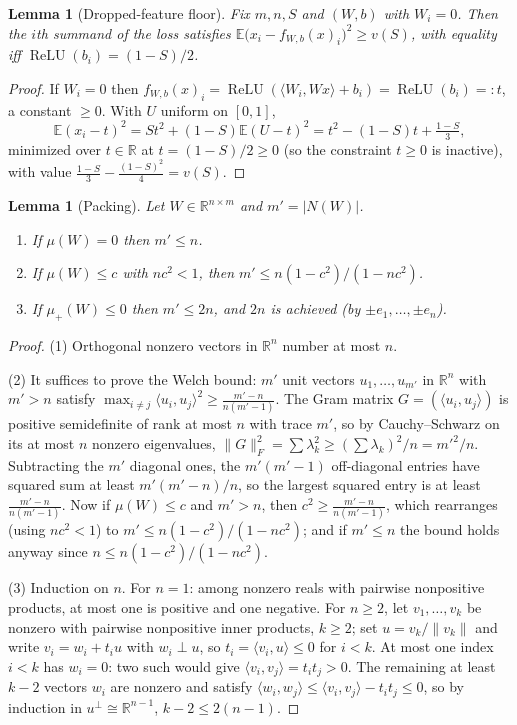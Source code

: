 \documentclass[11pt]{amsart}
\theoremstyle{plain}
\newtheorem{lemma}[theorem]{Lemma}
\theoremstyle{definition}
\DeclareMathOperator{\relu}{ReLU}
\newcommand{\E}{\mathbb{E}}
\newcommand{\R}{\mathbb{R}}
\begin{document}
\begin{lemma}[Dropped-feature floor]\label{lem:floor}
Fix $m,n,S$ and $(W,b)$ with $W_i=0$. Then the $i$th summand of the loss satisfies
$\E\bigl(x_i - f_{W,b}(x)_i\bigr)^2 \ge v(S)$, with equality iff $\relu(b_i)=(1-S)/2$.
\end{lemma}

\begin{proof}
If $W_i=0$ then $f_{W,b}(x)_i=\relu(\langle W_i, Wx\rangle + b_i)=\relu(b_i)=:t$, a constant $\ge0$. With $U$ uniform on $[0,1]$,
\[
\E(x_i-t)^2 = S t^2 + (1-S)\E(U-t)^2 = t^2-(1-S)t+\tfrac{1-S}{3},
\]
minimized over $t\in\R$ at $t=(1-S)/2\ge0$ (so the constraint $t\ge0$ is inactive), with value $\tfrac{1-S}{3}-\tfrac{(1-S)^2}{4}=v(S)$.
\end{proof}

\begin{lemma}[Packing]\label{lem:packing}
Let $W\in\R^{n\times m}$ and $m'=|N(W)|$.
\begin{enumerate}
\item If $\mu(W)=0$ then $m'\le n$.
\item If $\mu(W)\le c$ with $nc^2<1$, then $m' \le n(1-c^2)/(1-nc^2)$.
\item If $\mu_+(W)\le 0$ then $m'\le 2n$, and $2n$ is achieved (by $\pm e_1,\dots,\pm e_n$).
\end{enumerate}
\end{lemma}

\begin{proof}
(1) Orthogonal nonzero vectors in $\R^n$ number at most $n$.

(2) It suffices to prove the Welch bound: $m'$ unit vectors $u_1,\dots,u_{m'}$ in $\R^n$ with $m'>n$ satisfy $\max_{i\ne j}\langle u_i,u_j\rangle^2 \ge \frac{m'-n}{n(m'-1)}$. The Gram matrix $G=(\langle u_i,u_j\rangle)$ is positive semidefinite of rank at most $n$ with trace $m'$, so by Cauchy--Schwarz on its at most $n$ nonzero eigenvalues, $\|G\|_F^2=\sum\lambda_k^2\ge (\sum\lambda_k)^2/n = m'^2/n$. Subtracting the $m'$ diagonal ones, the $m'(m'-1)$ off-diagonal entries have squared sum at least $m'(m'-n)/n$, so the largest squared entry is at least $\frac{m'-n}{n(m'-1)}$. Now if $\mu(W)\le c$ and $m'>n$, then $c^2\ge\frac{m'-n}{n(m'-1)}$, which rearranges (using $nc^2<1$) to $m'\le n(1-c^2)/(1-nc^2)$; and if $m'\le n$ the bound holds anyway since $n\le n(1-c^2)/(1-nc^2)$.

(3) Induction on $n$. For $n=1$: among nonzero reals with pairwise nonpositive products, at most one is positive and one negative. For $n\ge2$, let $v_1,\dots,v_k$ be nonzero with pairwise nonpositive inner products, $k\ge2$; set $u=v_k/\|v_k\|$ and write $v_i=w_i+t_iu$ with $w_i\perp u$, so $t_i=\langle v_i,u\rangle\le0$ for $i<k$. At most one index $i<k$ has $w_i=0$: two such would give $\langle v_i,v_j\rangle=t_it_j>0$. The remaining at least $k-2$ vectors $w_i$ are nonzero and satisfy $\langle w_i,w_j\rangle\le \langle v_i,v_j\rangle - t_it_j\le0$, so by induction in $u^{\perp}\cong\R^{n-1}$, $k-2\le 2(n-1)$.
\end{proof}
\end{document}
